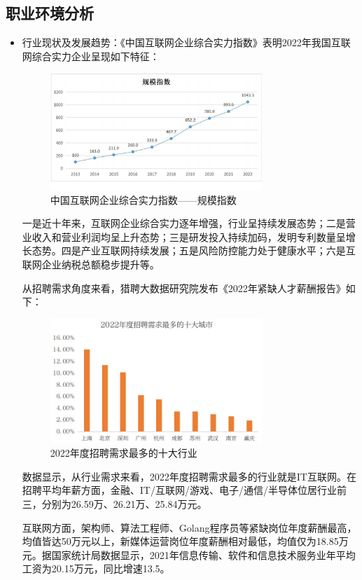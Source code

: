 \documentclass{article}
\begin{document}
\subsection{职业环境分析}
\begin{itemize}
\item 行业现状及发展趋势：《中国互联网企业综合实力指数》表明2022年我国互联网综合实力企业呈现如下特征：\par
\begin{figure}[h!]
	\centering
	\includegraphics[width=8cm]{guimo}
	\caption{中国互联网企业综合实力指数——规模指数}
	\label{fig:guimp}
\end{figure}
一是近十年来，互联网企业综合实力逐年增强，行业呈持续发展态势；二是营业收入和营业利润均呈上升态势；三是研发投入持续加码，发明专利数量呈增长态势。四是产业互联网持续发展；五是风险防控能力处于健康水平；六是互联网企业纳税总额稳步提升等。\par
从招聘需求角度来看，猎聘大数据研究院发布《2022年紧缺人才薪酬报告》如下：\par
\begin{figure}[h!]
	\centering
	\includegraphics[width=8cm]{zhaopin}
	\caption{2022年度招聘需求最多的十大行业}
	\label{fig:zhaopin}
\end{figure}
数据显示，从行业需求来看，2022年度招聘需求最多的行业就是IT互联网。在招聘平均年薪方面，金融、IT/互联网/游戏、电子/通信/半导体位居行业前三，分别为26.59万、26.21万、25.84万元。\par
互联网方面，架构师、算法工程师、Golang程序员等紧缺岗位年度薪酬最高，均值皆达50万元以上，新媒体运营岗位年度薪酬相对最低，均值仅为18.85万元。据国家统计局数据显示，2021年信息传输、软件和信息技术服务业年平均工资为20.15万元，同比增速13.5。\par

\end{itemize}
\end{document}
